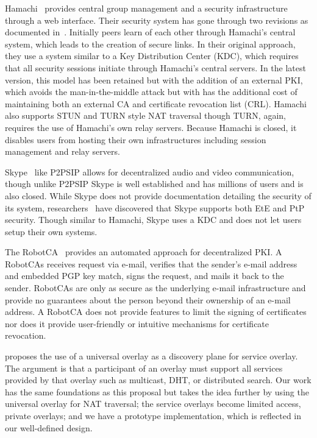 \documentclass[conference]{IEEEtran}
\begin{document}
Hamachi~\cite{hamachi} provides central group management and a security
infrastructure through a web interface.  Their security system has gone through
two revisions as documented in~\cite{hamachi_security}.  Initially peers learn
of each other through Hamachi's central system, which leads to the creation of
secure links.  In their original approach, they use a system similar to a Key
Distribution Center (KDC), which requires that all security sessions initiate
through Hamachi's central servers.  In the latest version, this model has been
retained but with the addition of an external PKI, which avoids the
man-in-the-middle attack but with has the additional cost of maintaining both
an external CA and certificate revocation list (CRL).  Hamachi also supports
STUN and TURN style NAT traversal though TURN, again, requires the use of
Hamachi's own relay servers.  Because Hamachi is closed, it disables users from
hosting their own infrastructures including session management and relay
servers.

Skype~\cite{skype} like P2PSIP allows for decentralized audio and video
communication, though unlike P2PSIP Skype is well established and has millions
of users and is also closed.  While Skype does not provide documentation
detailing the security of its system, researchers~\cite{skype_auth,
skype_overview} have discovered that Skype supports both EtE and PtP security.
Though similar to Hamachi, Skype uses a KDC and does not let users setup their
own systems.

The RobotCA~\cite{robotca} provides an automated approach for decentralized
PKI.  A RobotCAs receives request via e-mail, verifies that the sender's e-mail
address and embedded PGP key match, signs the request, and mails it back to the
sender.  RobotCAs are only as secure as the underlying e-mail infrastructure
and provide no guarantees about the person beyond their ownership of an e-mail
address.  A RobotCA does not provide features to limit the signing of
certificates nor does it provide user-friendly or intuitive mechanisms for
certificate revocation.

\cite{one_ring} proposes the use of a universal overlay as a discovery plane for
service overlay.  The argument is that a participant of an overlay
must support all services provided by that overlay such as multicast, DHT,
or distributed search.  Our work has the same foundations as this proposal but
takes the idea further by using the universal overlay for NAT traversal;
the service overlays become limited access, private overlays; and we have
a prototype implementation, which is reflected in our well-defined design.
\end{document}
